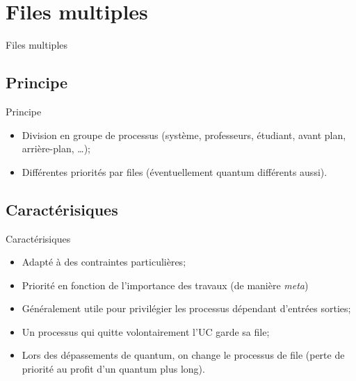 \def\sectitle{Files multiples}
\section{\sectitle}
\begin{frame}{\sectitle}
    \def\subsectitle{Principe}
    \subsection{\subsectitle}

    \begin{block}{\subsectitle}
        \begin{itemize}
            \item Division en groupe de processus (système, professeurs,
                étudiant, avant plan, arrière-plan, \dots);
            \item Différentes priorités par files (éventuellement quantum
                différents aussi).
        \end{itemize}
    \end{block}


    \def\subsectitle{Caractérisiques}
    \subsection{\subsectitle}
    \begin{block}{\subsectitle}
        \begin{itemize}
            \item Adapté à des contraintes particulières;
            \item Priorité en fonction de l'importance des travaux (de manière
                \textit{meta})
            \item Généralement utile pour privilégier les processus dépendant
                d'entrées sorties;
            \item Un processus qui quitte volontairement l'UC garde sa file;
            \item Lors des dépassements de quantum, on change le processus de
                file (perte de priorité au profit d'un quantum plus long).
        \end{itemize}
    \end{block}
\end{frame}

